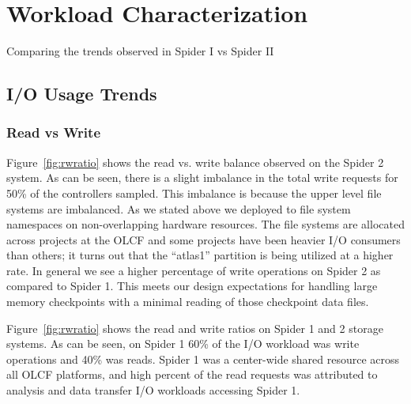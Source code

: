 \section{Workload Characterization}
\label{sec:workloadchar}



Comparing the trends observed in Spider I vs Spider II



\subsection{I/O Usage Trends}

\subsubsection{Read vs Write}


Figure~\ref{fig:rwratio} shows the read vs. write balance observed on the
Spider 2 system.  As can be seen, there is a slight imbalance in the total
write requests for 50\% of the controllers sampled. This imbalance is because
the upper level file systems are imbalanced. As we stated above we deployed to
file system namespaces on  non-overlapping hardware resources. The file systems
are allocated across projects at the OLCF and some projects have been heavier
I/O consumers than others; it turns out that the ``atlas1'' partition is being
utilized at a higher rate.  In general we see a higher percentage of write
operations on Spider 2 as compared to Spider 1. This meets our design
expectations for handling large memory checkpoints with a minimal reading of
those checkpoint data files.


Figure~\ref{fig:rwratio} shows the read and write ratios on Spider 1 and 2
storage systems. As can be seen, on Spider 1 60\% of the I/O workload was write
operations and 40\% was reads. Spider 1 was a center-wide shared resource
across all OLCF platforms, and high percent of the read requests was attributed
to analysis and data transfer I/O workloads accessing Spider 1. 

